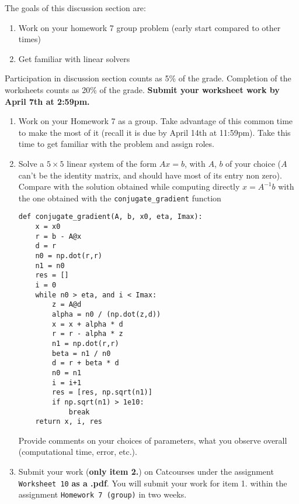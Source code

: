 \documentclass[11pt]{article}
\begin{document}
The goals of this discussion section are: 

\begin{enumerate}
\item Work on your homework 7 group problem (early start compared to other times)
\item Get familiar with linear solvers
\end{enumerate}

Participation in discussion section counts as 5\% of the grade. Completion of the worksheets counts as 20\% of the grade. \textbf{Submit your worksheet work by April 7th at 2:59pm.}

\begin{enumerate}
\item Work on your Homework 7 as a group. Take advantage of this common time to make the most of it (recall it is due by April 14th at 11:59pm). Take this time to get familiar with the problem and assign roles.
\item Solve a $5 \times 5$ linear system of the form $A x = b$, with $A$, $b$ of your choice ($A$ can't be the identity matrix, and should have most of its entry non zero). Compare with the solution obtained while computing directly $x =A^{-1}b $ with the one obtained with the \texttt{conjugate\_gradient} function 
\begin{verbatim}
def conjugate_gradient(A, b, x0, eta, Imax):
    x = x0
    r = b - A@x
    d = r 
    n0 = np.dot(r,r)
    n1 = n0
    res = []
    i = 0
    while n0 > eta, and i < Imax:
        z = A@d
        alpha = n0 / (np.dot(z,d))
        x = x + alpha * d
        r = r - alpha * z
        n1 = np.dot(r,r)
        beta = n1 / n0
        d = r + beta * d
        n0 = n1
        i = i+1
        res = [res, np.sqrt(n1)]
        if np.sqrt(n1) > 1e10:
            break
    return x, i, res
\end{verbatim}
Provide comments on your choices of parameters, what you observe overall (computational time, error, etc.).
\item Submit your work (\textbf{only item 2.}) on Catcourses under the assignment \texttt{Worksheet 10} \textbf{as a .pdf}. You will submit your work for item 1. within the assignment \texttt{Homework 7 (group)} in two weeks.
\end{enumerate}
\end{document}
